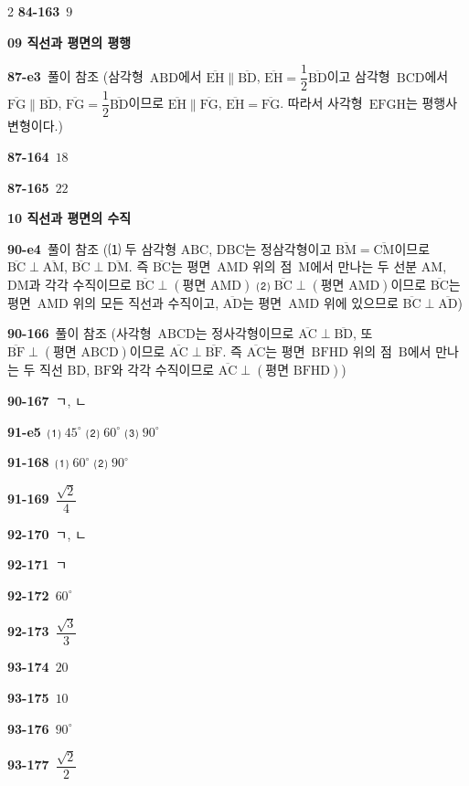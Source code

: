 \documentclass[10pt,a4paper]{article}
\newcommand{\pt}[1]{\mathrm{#1}}
\newcommand{\seg}[1]{\overline{\mathrm{#1}}}
\begin{document}
\begin{multicols}{2}
\noindent\textbf{84-163}\ $9$\par
\noindent\textbf{09 직선과 평면의 평행}\par\smallskip
\noindent\textbf{87-e3}\ 풀이 참조 (삼각형~$\pt{ABD}$에서 $\seg{EH}\parallel\seg{BD}$, $\seg{EH}=\dfrac{1}{2}\seg{BD}$이고 삼각형~$\pt{BCD}$에서 $\seg{FG}\parallel\seg{BD}$, $\seg{FG}=\dfrac{1}{2}\seg{BD}$이므로 $\seg{EH}\parallel\seg{FG}$, $\seg{EH}=\seg{FG}$. 따라서 사각형~$\pt{EFGH}$는 평행사변형이다.)\par
\noindent\textbf{87-164}\ $18$\par
\noindent\textbf{87-165}\ $22$\par
\noindent\textbf{10 직선과 평면의 수직}\par\smallskip
\noindent\textbf{90-e4}\ 풀이 참조 (⑴ 두 삼각형 $\pt{ABC}$, $\pt{DBC}$는 정삼각형이고 $\seg{BM}=\seg{CM}$이므로 $\seg{BC}\perp\seg{AM}$, $\seg{BC}\perp\seg{DM}$. 즉 $\seg{BC}$는 평면~$\pt{AMD}$ 위의 점~$\pt{M}$에서 만나는 두 선분 $\pt{AM}$, $\pt{DM}$과 각각 수직이므로 $\seg{BC}\perp(\text{평면 }\pt{AMD})$ ⑵ $\seg{BC}\perp(\text{평면 }\pt{AMD})$이므로 $\seg{BC}$는 평면~$\pt{AMD}$ 위의 모든 직선과 수직이고, $\seg{AD}$는 평면~$\pt{AMD}$ 위에 있으므로 $\seg{BC}\perp\seg{AD}$)\par
\noindent\textbf{90-166}\ 풀이 참조 (사각형~$\pt{ABCD}$는 정사각형이므로 $\seg{AC}\perp\seg{BD}$, 또 $\seg{BF}\perp(\text{평면 }\pt{ABCD})$이므로 $\seg{AC}\perp\seg{BF}$. 즉 $\seg{AC}$는 평면~$\pt{BFHD}$ 위의 점~$\pt{B}$에서 만나는 두 직선 $\pt{BD}$, $\pt{BF}$와 각각 수직이므로 $\seg{AC}\perp(\text{평면 }\pt{BFHD})$)\par
\noindent\textbf{90-167}\ ㄱ, ㄴ\par
\noindent\textbf{91-e5}\ ⑴ $45^\circ$ ⑵ $60^\circ$ ⑶ $90^\circ$\par
\noindent\textbf{91-168}\ ⑴ $60^\circ$ ⑵ $90^\circ$\par
\noindent\textbf{91-169}\ $\dfrac{\sqrt{2}}{4}$\par
\noindent\textbf{92-170}\ ㄱ, ㄴ\par
\noindent\textbf{92-171}\ ㄱ\par
\noindent\textbf{92-172}\ $60^\circ$\par
\noindent\textbf{92-173}\ $\dfrac{\sqrt{3}}{3}$\par
\noindent\textbf{93-174}\ $20$\par
\noindent\textbf{93-175}\ $10$\par
\noindent\textbf{93-176}\ $90^\circ$\par
\noindent\textbf{93-177}\ $\dfrac{\sqrt{2}}{2}$\par

\end{multicols}
\end{document}
